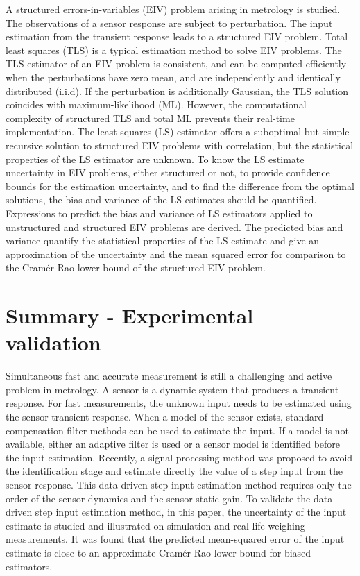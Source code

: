 A structured errors-in-variables (EIV) problem arising in metrology is studied.
The observations of a sensor response are subject to perturbation. 
The input estimation from the transient response leads to a structured EIV problem.
Total least squares (TLS) is a typical estimation method to solve EIV problems.
The TLS estimator of an EIV problem is consistent, and can be computed efficiently when the perturbations have zero mean, and are independently and identically distributed (i.i.d).
If the perturbation is additionally Gaussian, the TLS solution coincides with maximum-likelihood (ML).
However, the computational complexity of structured TLS and total ML prevents their real-time implementation.
The least-squares (LS) estimator offers a suboptimal but simple recursive solution to structured EIV problems with correlation, but the statistical properties of the LS estimator are unknown.
To know the LS estimate uncertainty in EIV problems, either structured or not, to provide confidence bounds for the estimation uncertainty, and to find the difference from the optimal solutions, the bias and variance of the LS estimates should be quantified.
Expressions to predict the bias and variance of LS estimators applied to unstructured and structured EIV problems are derived.
The predicted bias and variance quantify the statistical properties of the LS estimate and give an approximation of the uncertainty and the mean squared error for comparison to the Cram\'er-Rao lower bound of the structured EIV problem.

\section{Summary - Experimental validation}

Simultaneous fast and accurate measurement is still a challenging and active problem in metrology.
A sensor is a dynamic system that produces a transient response.
For fast measurements, the unknown input needs to be estimated using the sensor transient response.
When a model of the sensor exists, standard compensation filter methods can be used to estimate the input.
If a model is not available, either an adaptive filter is used or a sensor model is identified before the input estimation. 
Recently, a signal processing method was proposed to avoid the identification stage and estimate directly the value of a step input from the sensor response.
This data-driven step input estimation method requires only the order of the sensor dynamics and the sensor static gain.
To validate the data-driven step input estimation method, in this paper, the uncertainty of the input estimate is studied and illustrated on simulation and real-life weighing measurements.
It was found that the predicted mean-squared error of the input estimate is close to an approximate Cram\'er-Rao lower bound for biased estimators.

